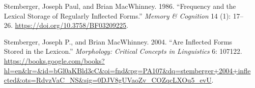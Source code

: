 \documentclass[
  letterpaper,
  DIV=11,
  numbers=noendperiod,
  nottoc]{scrreprt}
\newlength{\cslhangindent}
\newenvironment{CSLReferences}[2] %
 {\begin{list}{}{%
  \setlength{\itemindent}{0pt}
  \setlength{\leftmargin}{0pt}
  \setlength{\parsep}{0pt}
  \ifodd #1
   \setlength{\leftmargin}{\cslhangindent}
   \setlength{\itemindent}{-1\cslhangindent}
  \fi
  \setlength{\itemsep}{#2\baselineskip}}}
 {\end{list}}
\begin{document}
\begin{CSLReferences}{1}{0}
Stemberger, Joseph Paul, and Brian MacWhinney. 1986. {``Frequency and
the Lexical Storage of Regularly Inflected Forms.''} \emph{Memory \&
Cognition} 14 (1): 17--26. \url{https://doi.org/10.3758/BF03209225}.

Stemberger, Joseph P., and Brian MacWhinney. 2004. {``Are Inflected
Forms Stored in the Lexicon.''} \emph{Morphology: Critical Concepts in
Linguistics} 6: 107122.
\url{https://books.google.com/books?hl=en&lr=&id=bGl0aKBld3cC&oi=fnd&pg=PA107&dq=stemberger+2004+inflected&ots=RdvzVaC_NS&sig=0DJV8gUVaoZv_COZqcLXOu5_evU}.

\end{CSLReferences}
\end{document}
